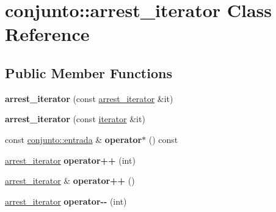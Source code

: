 \hypertarget{classconjunto_1_1arrest__iterator}{\section{conjunto\-:\-:arrest\-\_\-iterator Class Reference}
\label{classconjunto_1_1arrest__iterator}
}
\subsection*{Public Member Functions}
\begin{DoxyCompactItemize}
\item 
\hypertarget{classconjunto_1_1arrest__iterator_ad38cb7a345d56aebbd01f7e9dbe07d2b}{{\bfseries arrest\-\_\-iterator} (const \hyperlink{classconjunto_1_1arrest__iterator}{arrest\-\_\-iterator} \&it)}\label{classconjunto_1_1arrest__iterator_ad38cb7a345d56aebbd01f7e9dbe07d2b}

\item 
\hypertarget{classconjunto_1_1arrest__iterator_a3cf822e4a5b24e599b1802215395eb76}{{\bfseries arrest\-\_\-iterator} (const \hyperlink{classconjunto_1_1iterator}{iterator} \&it)}\label{classconjunto_1_1arrest__iterator_a3cf822e4a5b24e599b1802215395eb76}

\item 
\hypertarget{classconjunto_1_1arrest__iterator_af5d59b1520a0b95e754862d032f67c97}{const \hyperlink{classconjunto_a09cad766dd65de73e51eae21f9d22585}{conjunto\-::entrada} \& {\bfseries operator$\ast$} () const }\label{classconjunto_1_1arrest__iterator_af5d59b1520a0b95e754862d032f67c97}

\item 
\hypertarget{classconjunto_1_1arrest__iterator_ad81d06fac99e6fef22aa6d5c28a8015b}{\hyperlink{classconjunto_1_1arrest__iterator}{arrest\-\_\-iterator} {\bfseries operator++} (int)}\label{classconjunto_1_1arrest__iterator_ad81d06fac99e6fef22aa6d5c28a8015b}

\item 
\hypertarget{classconjunto_1_1arrest__iterator_ac7e416364a83c613e2de30a46a514a6e}{\hyperlink{classconjunto_1_1arrest__iterator}{arrest\-\_\-iterator} \& {\bfseries operator++} ()}\label{classconjunto_1_1arrest__iterator_ac7e416364a83c613e2de30a46a514a6e}

\item 
\hypertarget{classconjunto_1_1arrest__iterator_a035f1132a07bf97fd938aec77a02a445}{\hyperlink{classconjunto_1_1arrest__iterator}{arrest\-\_\-iterator} {\bfseries operator-\/-\/} (int)}\label{classconjunto_1_1arrest__iterator_a035f1132a07bf97fd938aec77a02a445}


\end{DoxyCompactItemize}
